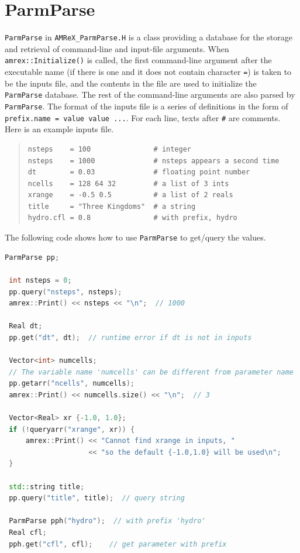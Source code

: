 \section{ParmParse}
\label{sec:basics:parmparse}

{\tt ParmParse} in {\tt AMReX\_ParmParse.H} is a class providing a
database for the storage and retrieval of command-line and input-file
arguments.  When {\tt amrex::Initialize()} is called, the first
command-line argument after the executable name (if there is one and
it does not contain character {\tt =}) is taken to be the inputs file,
and the contents in the file are used to initialize the {\tt
  ParmParse} database.  The rest of the command-line arguments are
also parsed by {\tt ParmParse}.  The format of the inputs file is a
series of definitions in the form of {\tt prefix.name = value value
  ...}.  For each line, texts after {\tt \#} are comments.  Here is an
example inputs file.
\begin{quote}
\begin{verbatim}
nsteps    = 100               # integer
nsteps    = 1000              # nsteps appears a second time
dt        = 0.03              # floating point number
ncells    = 128 64 32         # a list of 3 ints
xrange    = -0.5 0.5          # a list of 2 reals
title     = "Three Kingdoms"  # a string
hydro.cfl = 0.8               # with prefix, hydro 
\end{verbatim}
\end{quote}
The following code shows how to use {\tt ParmParse} to get/query the values.
\begin{lstlisting}[language=cpp]
 ParmParse pp;
 
 int nsteps = 0;
 pp.query("nsteps", nsteps);
 amrex::Print() << nsteps << "\n";  // 1000
 
 Real dt;
 pp.get("dt", dt);  // runtime error if dt is not in inputs
 
 Vector<int> numcells;
 // The variable name 'numcells' can be different from parameter name 'ncells'.
 pp.getarr("ncells", numcells);
 amrex::Print() << numcells.size() << "\n";  // 3
 
 Vector<Real> xr {-1.0, 1.0};
 if (!queryarr("xrange", xr)) {
     amrex::Print() << "Cannot find xrange in inputs, "
                    << "so the default {-1.0,1.0} will be used\n";
 }
 
 std::string title;
 pp.query("title", title);  // query string
 
 ParmParse pph("hydro");  // with prefix 'hydro'
 Real cfl;
 pph.get("cfl", cfl);    // get parameter with prefix
\end{lstlisting}
